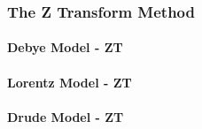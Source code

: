 \subsubsection{The Z Transform Method}
\paragraph{Debye Model - ZT}

\paragraph{Lorentz Model - ZT}

\paragraph{Drude Model - ZT}
